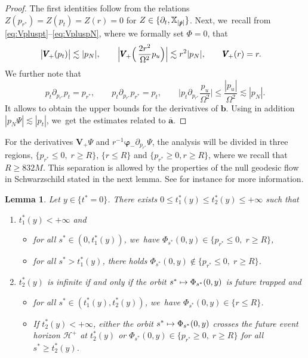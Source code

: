 \documentclass[JEP,XML,SOM,Unicode,published]{cedram}
\newcommand\mto{\mathchoice{\longmapsto}{\mapsto}{\mapsto}{\mapsto}}
\theoremstyle{plain}
\newtheorem{lemma}[proposition]{Lemma}
\theoremstyle{definition}
\newcommand\T{{\mathbb{X}}}
\begin{document}
\begin{proof}
The first identities follow from the relations $Z(p_{r^*})=Z(p_t)=Z(r)=0$ for $Z \in \{ \partial_t, \T_{|\slashed{p}|} \}$. Next, we~recall from \eqref{eq:Vpluspt}--\eqref{eq:VpluspN}, where we formally set $\Phi=0$, that
\begin{align*}
\big|\pmb{V}_{\! +}(p_t) \big| & \lesssim |p_N|,\qquad \Big| \pmb{V}_{\! +} \Bigl(\, \frac{2r^2 }{\Omega^2}p_u \Bigr) \Big| \lesssim r^2|p_N|,\qquad \pmb{V}_{\! +}(r)=r.
\end{align*}
We further note that
\[
p_t \partial_{p_{r^*}} p_t =p_{r^*},\qquad p_t \partial_{p_{r^*}} p_{r^*} =p_t,\qquad \Big| p_t \partial_{p_{r^*}} \frac{p_u}{\Omega^2} \Big| \leq \frac{|p_u|}{\Omega^2} \lesssim |p_N|.
\]
It allows to obtain the upper bounds for the derivatives of $\pmb{b}$. Using in addition \hbox{$|p_N \Psi| \lesssim |p_t|$}, we~get the estimates related to $\overline{\pmb{a}}$.
\end{proof}

For the derivatives $\pmb{V}_{\! +} \Psi$ and $r^{-1}\pmb{\varphi}_- \partial_{p_{r^*}} \Psi$, the analysis will be divided in three regions, $\{ p_{r^*} \leq 0, \; r \geq R \}$, $\{ r \leq R \}$ and $\{ p_{r^*} \geq 0, r \geq R\}$, where we recall that $R \geq 832M$. This separation is allowed by the properties of the null geodesic flow in Schwarzschild stated in the next lemma. See for instance \cite[Ch.\,13]{O83} for more information.

\begin{lemma}\label{Lemgeodtime}
Let $y \in \{ t^*=0 \}$. There exists $0 \leq t^*_{1}(y) \leq t_2^*(y) \leq + \infty$ such that
\begin{enumerate}
\item $t_1^*(y) <+\infty$ and
\begin{itemize}
\item for all $s^* \in (0,t^*_1(y))$, we~have $\Phi_{s^*}(0,y) \in \{ p_{r^*} \leq 0, \; r \geq R \}$,
\item for all $s^* > t^*_1(y)$, there holds $\Phi_{s^*}(0,y) \notin \{ p_{r^*} \leq 0, \; r \geq R \}$.
\end{itemize}
\item $t_2^*(y)$ is infinite if and only if the orbit $s^* \mto \Phi_{s^*}(0,y)$ is future trapped and
\begin{itemize}
\item for all $s^* \in (t^*_1(y),t_2^*(y))$, we~have $\Phi_{s^*}(0,y) \in \{ r \leq R \}$.
\item If $t^*_2(y)<+\infty$, either the orbit $s^* \mto \Phi_{s^*}(0,y)$ crosses the future event horizon $\mathcal{H}^+$ at $t^*_2(y)$ or $\Phi_{s^*}(0,y) \in \{ p_{r^*} \geq 0, \; r \geq R \}$ for all $s^* \geq t^*_2(y)$.
\end{itemize}
\end{enumerate}
\end{lemma}
\end{document}
